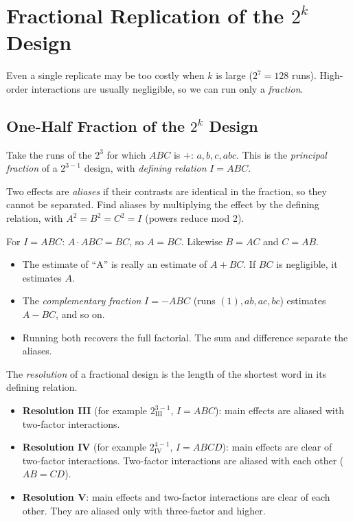 \section{Fractional Replication of the $2^k$ Design}

Even a single replicate may be too costly when $k$ is large ($2^7=128$ runs). High-order interactions are usually negligible, so we can run only a \emph{fraction}.

\subsection{One-Half Fraction of the $2^k$ Design}

Take the runs of the $2^3$ for which $ABC$ is $+$: $a,b,c,abc$. This is the \emph{principal fraction} of a $2^{3-1}$ design, with \emph{defining relation} $I=ABC$.

\begin{definition}[Alias]
Two effects are \emph{aliases} if their contrasts are identical in the fraction, so they cannot be separated. Find aliases by multiplying the effect by the defining relation, with $A^2=B^2=C^2=I$ (powers reduce mod 2).
\end{definition}

For $I=ABC$: $A\cdot ABC=BC$, so $A=BC$. Likewise $B=AC$ and $C=AB$.
\begin{itemize}
  \item The estimate of ``A'' is really an estimate of $A+BC$. If $BC$ is negligible, it estimates $A$.
  \item The \emph{complementary fraction} $I=-ABC$ (runs $(1),ab,ac,bc$) estimates $A-BC$, and so on.
  \item Running both recovers the full factorial. The sum and difference separate the aliases.
\end{itemize}

\begin{definition}[Resolution]
The \emph{resolution} of a fractional design is the length of the shortest word in its defining relation.
\begin{itemize}
  \item \textbf{Resolution III} (for example $2^{3-1}_{\mathrm{III}}$, $I=ABC$): main effects are aliased with two-factor interactions.
  \item \textbf{Resolution IV} (for example $2^{4-1}_{\mathrm{IV}}$, $I=ABCD$): main effects are clear of two-factor interactions. Two-factor interactions are aliased with each other ($AB=CD$).
  \item \textbf{Resolution V}: main effects and two-factor interactions are clear of each other. They are aliased only with three-factor and higher.
\end{itemize}
\end{definition}

